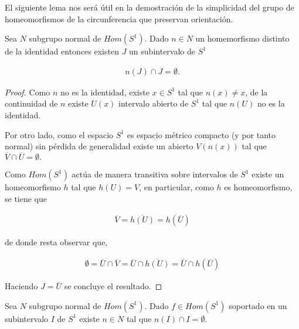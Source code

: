 El siguiente lema nos será útil en la demostración de la simplicidad del grupo de homeomorfismos de la circunferencia que preservan orientación. 


\begin{lm}
Sea $N$ subgrupo normal  de $Hom(S^1)$. Dado $n \in N$ un homemorfismo distinto de la identidad entonces existen $J$ un subintervalo de $S^1$ 

\begin{align*}
n(J) \cap J = \emptyset.
\end{align*}
\end{lm}

\begin{proof}
Como $n$ no es la identidad, existe $x \in S^1$ tal que $n(x) \neq x$, de la continuidad de $n$ existe $U(x)$ intervalo abierto de $S^1$ tal que $n(U)$ no es la identidad.

Por otro lado, como el espacio $S^1$ es espacio métrico compacto (y por tanto normal) sin pérdida de generalidad existe un abierto $V(n(x)) $ tal que $\overline{V} \cap \overline{U} = \emptyset. $ 

Como $Hom(S^1)$ actúa de manera transitiva sobre intervalos de $S^1$ existe un homeomorfismo $h$ tal que $h(U)=V$, en particular, como $h$ es homeomorfismo, se tiene que 

\begin{align*}
\overline{V}=\overline{h(U)}=h(\overline{U})
\end{align*}

de donde resta observar que, 

\begin{align*}
\emptyset=\overline{U} \cap \overline{V} = \overline{U} \cap \overline{h(U)}=\overline{U} \cap h(\overline{U})
\end{align*}

Haciendo $J = \overline{U}$ se concluye el resultado. 
\end{proof}


\begin{lm}\label{lm:homeo_separador_de_intervalos}
Sea $N$ subgrupo normal  de $Hom(S^1)$. Dado $f \in Hom(S^1)$ soportado en un subintervalo $I$ de $S^1$ existe $n \in N$ tal que $n(I) \cap I = \emptyset.$
\end{lm}

